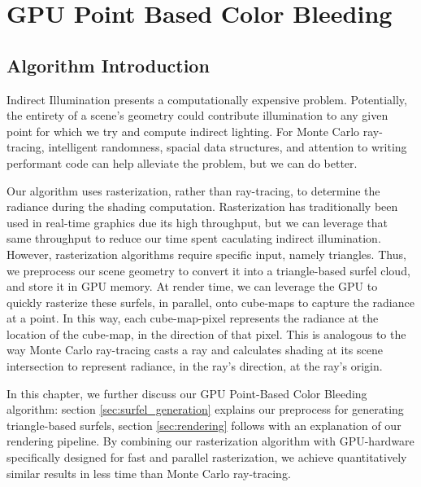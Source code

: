 \chapter{GPU Point Based Color Bleeding}

\section{Algorithm Introduction}

Indirect Illumination presents a computationally expensive problem. Potentially, the entirety of a scene's geometry could contribute illumination to any given point for which we try and compute indirect lighting. For Monte Carlo ray-tracing, intelligent randomness, spacial data structures, and attention to writing performant code can help alleviate the problem, but we can do better.

Our algorithm uses rasterization, rather than ray-tracing, to determine the radiance during the shading computation. Rasterization has traditionally been used in real-time graphics due its high throughput, but we can leverage that same throughput to reduce our time spent caculating indirect illumination. However, rasterization algorithms require specific input, namely triangles. Thus, we preprocess our scene geometry to convert it into a triangle-based surfel cloud, and store it in GPU memory. At render time, we can leverage the GPU to quickly rasterize these surfels, in parallel, onto cube-maps to capture the radiance at a point. In this way, each cube-map-pixel represents the radiance at the location of the cube-map, in the direction of that pixel. This is analogous to the way Monte Carlo ray-tracing casts a ray and calculates shading at its scene intersection to represent radiance, in the ray's direction, at the ray's origin.

In this chapter, we further discuss our GPU Point-Based Color Bleeding algorithm: section \ref{sec:surfel_generation} explains our preprocess for generating triangle-based surfels, section \ref{sec:rendering} follows with an explanation of our rendering pipeline. By combining our rasterization algorithm with GPU-hardware specifically designed for fast and parallel rasterization, we achieve quantitatively similar results in less time than Monte Carlo ray-tracing.

